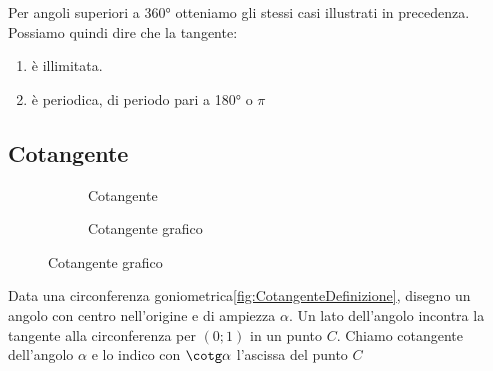 Per angoli superiori a \ang{360} otteniamo gli stessi casi illustrati in precedenza. 
Possiamo quindi dire che la tangente:
\begin{enumerate}
	\item è illimitata.
	\item è periodica, di periodo pari a \ang{180} o $\pi$
\end{enumerate} 
\begin{figure}
	\centering

	\label{fig:AndamentoTangente1}
\end{figure}%
\begin{figure}
	\centering
	
\label{fig:AndamentoTangente2}
\end{figure}%
\subsection{Cotangente}
\label{sec:Cotangente}
\begin{figure}
	\begin{subfigure}[b]{.5\linewidth}
		\centering
		
	\caption{Cotangente}\label{fig:CotangenteDefinizione}
	\end{subfigure}%
	\begin{subfigure}[b]{.5\linewidth}
		\centering
		\caption{Cotangente grafico}\label{fig:CotangenteGrafico}
	\end{subfigure}
	\label{tab:funztg}
\end{figure}
%		
\begin{definizione}[Cotangente]
	Data una circonferenza goniometrica\nobs\vref{fig:CotangenteDefinizione}, disegno un angolo con centro nell'origine e di ampiezza $\alpha$. Un lato dell'angolo incontra la tangente  alla circonferenza  per $(0;1)$ in un punto $C$.  Chiamo cotangente dell'angolo $\alpha$ e lo indico con $\cotg\alpha$ l'ascissa  del punto $C$
\end{definizione}
